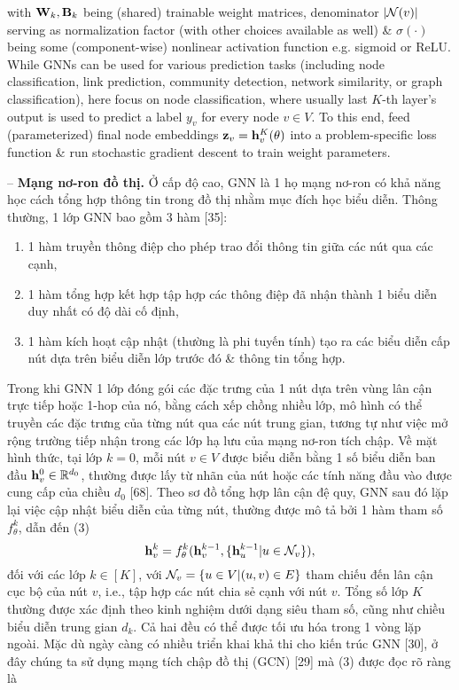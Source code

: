 \documentclass{article}
\begin{document}
\begin{itemize}
    with ${\bf W}_k,{\bf B}_k$ being (shared) trainable weight matrices, denominator $|{\cal N}(v)|$ serving as normalization factor (with other choices available as well) \& $\sigma(\cdot)$ being some (component-wise) nonlinear activation function e.g. sigmoid or ReLU. While GNNs can be used for various prediction tasks (including node classification, link prediction, community detection, network similarity, or graph classification), here focus on node classification, where usually last $K$-th layer's output is used to predict a label $y_v$ for every node $v\in V$. To this end, feed (parameterized) final node embeddings ${\bf z}_v = {\bf h}_v^K(\theta)$ into a problem-specific loss function \& run stochastic gradient descent to train weight parameters.

    -- {\bf Mạng nơ-ron đồ thị.} Ở cấp độ cao, GNN là 1 họ mạng nơ-ron có khả năng học cách tổng hợp thông tin trong đồ thị nhằm mục đích học biểu diễn. Thông thường, 1 lớp GNN bao gồm 3 hàm [35]:
    \begin{enumerate}
        \item 1 hàm truyền thông điệp cho phép trao đổi thông tin giữa các nút qua các cạnh,
        \item 1 hàm tổng hợp kết hợp tập hợp các thông điệp đã nhận thành 1 biểu diễn duy nhất có độ dài cố định,
        \item 1 hàm kích hoạt cập nhật (thường là phi tuyến tính) tạo ra các biểu diễn cấp nút dựa trên biểu diễn lớp trước đó \& thông tin tổng hợp.
    \end{enumerate}
    Trong khi GNN 1 lớp đóng gói các đặc trưng của 1 nút dựa trên vùng lân cận trực tiếp hoặc 1-hop của nó, bằng cách xếp chồng nhiều lớp, mô hình có thể truyền các đặc trưng của từng nút qua các nút trung gian, tương tự như việc mở rộng trường tiếp nhận trong các lớp hạ lưu của mạng nơ-ron tích chập. Về mặt hình thức, tại lớp $k = 0$, mỗi nút $v\in V$ được biểu diễn bằng 1 số biểu diễn ban đầu ${\bf h}_v^0\in\mathbb{R}^{d_0}$, thường được lấy từ nhãn của nút hoặc các tính năng đầu vào được cung cấp của chiều $d_0$ [68]. Theo sơ đồ tổng hợp lân cận đệ quy, GNN sau đó lặp lại việc cập nhật biểu diễn của từng nút, thường được mô tả bởi 1 hàm tham số $f_\theta^k$, dẫn đến (3)
    \begin{equation*}
        {\bf h}_v^k = f_\theta^k({\bf h}_v^{k-1},\{{\bf h}_u^{k-1}|u\in{\cal N}_v\}),
    \end{equation*}
    đối với các lớp $k\in[K]$, với ${\cal N}_v = \{u\in V|(u,v)\in E\}$ tham chiếu đến lân cận cục bộ của nút $v$, i.e., tập hợp các nút chia sẻ cạnh với nút $v$. Tổng số lớp $K$ thường được xác định theo kinh nghiệm dưới dạng siêu tham số, cũng như chiều biểu diễn trung gian $d_k$. Cả hai đều có thể được tối ưu hóa trong 1 vòng lặp ngoài. Mặc dù ngày càng có nhiều triển khai khả thi cho kiến trúc GNN [30], ở đây chúng ta sử dụng mạng tích chập đồ thị (GCN) [29] mà (3) được đọc rõ ràng là

\end{itemize}
\end{document}
